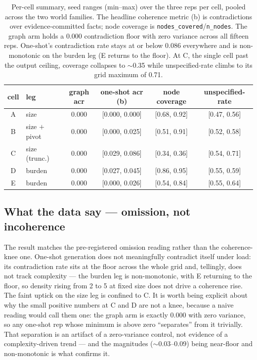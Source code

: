 \documentclass[11pt]{article}
\newcommand{\code}[1]{\texttt{\small #1}}
\begin{document}
\begin{table}[h]
\centering
\begin{tabular}{@{}clcccc@{}}
\toprule
cell & leg & graph acr & one-shot acr (b) & node coverage & unspecified-rate \\
\midrule
A & size            & 0.000 & [0.000, 0.000] & [0.68, 0.92] & [0.47, 0.56] \\
B & size $+$ pivot  & 0.000 & [0.000, 0.025] & [0.51, 0.91] & [0.52, 0.58] \\
C & size (trunc.)   & 0.000 & [0.029, 0.086] & [0.34, 0.36] & [0.54, 0.71] \\
D & burden          & 0.000 & [0.027, 0.045] & [0.86, 0.95] & [0.55, 0.59] \\
E & burden          & 0.000 & [0.000, 0.026] & [0.54, 0.84] & [0.55, 0.64] \\
\bottomrule
\end{tabular}
\caption{Per-cell summary, seed ranges (min--max) over the three reps per cell, pooled across
the two world families. The headline coherence metric (b) is contradictions over
evidence-committed facts; node coverage is \code{nodes\_covered}/\code{n\_nodes}. The graph arm
holds a 0.000 contradiction floor with zero variance across all fifteen reps. One-shot's
contradiction rate stays at or below 0.086 everywhere and is non-monotonic on the burden leg
(E returns to the floor). At C, the single cell past the output ceiling, coverage collapses to
$\sim$0.35 while unspecified-rate climbs to its grid maximum of 0.71.}
\end{table}

\subsection*{What the data say --- omission, not incoherence}
The result matches the pre-registered omission reading rather than the coherence-knee one.
One-shot generation does not meaningfully contradict itself under load: its contradiction rate
sits at the floor across the whole grid and, tellingly, does not track complexity --- the burden
leg is non-monotonic, with E returning to the floor, so density rising from 2 to 5 at fixed size
does not drive a coherence rise. The faint uptick on the size leg is confined to C. It is worth
being explicit about why the small positive numbers at C and D are not a knee, because a naive
reading would call them one: the graph arm is exactly 0.000 with zero variance, so any one-shot
rep whose minimum is above zero ``separates'' from it trivially. That separation is an artifact
of a zero-variance control, not evidence of a complexity-driven trend --- and the magnitudes
($\sim$0.03--0.09) being near-floor and non-monotonic is what confirms it.
\end{document}
